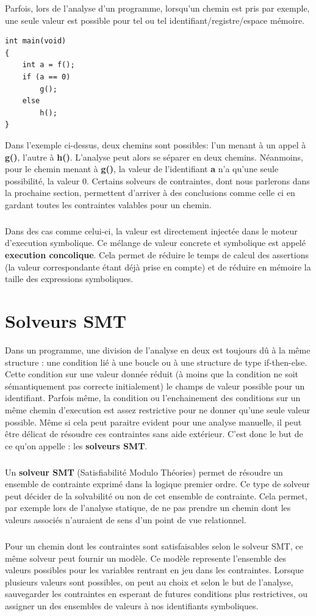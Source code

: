 Parfois, lors de l'analyse d'un programme, lorsqu'un chemin est pris par exemple, une seule valeur est possible pour tel ou tel identifiant/registre/espace mémoire.
\begin {lstlisting}[frame=single]
int main(void)
{
    int a = f();
    if (a == 0)
        g();
    else
        h();
}
\end{lstlisting}
Dans l'exemple ci-dessus, deux chemins sont possibles: l'un menant à un appel à \textbf{g()}, l'autre à \textbf{h()}.
L'analyse peut alors se séparer en deux chemins. Néanmoins, pour le chemin menant à \textbf{g()}, la valeur de l'identifiant \textbf{a}
n'a qu'une seule possibilité, la valeur 0. Certains solveurs de contraintes, dont nous parlerons dans la prochaine section, permettent d'arriver
à des conclusions comme celle ci en gardant toutes les contraintes valables pour un chemin.
\subparagraph{}
Dans des cas comme celui-ci, la valeur est directement injectée dans le moteur d'execution symbolique. Ce mélange de valeur concrete et symbolique est
appelé \textbf{execution concolique}. Cela permet de réduire le temps de calcul des assertions (la valeur correspondante étant déjà prise en compte) et de
réduire en mémoire la taille des expressions symboliques.


\section{Solveurs SMT}
Dans un programme, une division de l'analyse en deux est toujours dû à la même structure : une condition lié à une boucle ou à une structure de type if-then-else.
Cette condition sur une valeur donnée réduit (à moins que la condition ne soit sémantiquement pas correcte initialement) le champs de valeur possible pour un identifiant.
Parfois même, la condition ou l'enchainement des conditions sur un même chemin d'execution est assez restrictive pour ne donner qu'une seule valeur possible.
Même si cela peut paraitre evident pour une analyse manuelle, il peut être délicat de résoudre ces contraintes sans aide extérieur. C'est donc le but de ce qu'on appelle : les \textbf{solveurs SMT}.
\subparagraph{}
Un \textbf{solveur SMT} (Satisfiabilité Modulo Théories) permet de résoudre un ensemble de contrainte exprimé dans la logique premier ordre. Ce type de solveur peut décider
de la solvabilité ou non de cet ensemble de contrainte. Cela permet, par exemple lors de l'analyse statique, de ne pas prendre un chemin dont les valeurs associés n'auraient
de sens d'un point de vue relationnel.
\subparagraph{}
Pour un chemin dont les contraintes sont satisfaisables selon le solveur SMT, ce même solveur peut fournir un modèle. Ce modèle represente l'ensemble des valeurs possibles
pour les variables rentrant en jeu dans les contraintes. Lorsque plusieurs valeurs sont possibles, on peut au choix et selon le but de l'analyse, sauvegarder les contraintes
en esperant de futures conditions plus restrictives, ou assigner un des ensembles de valeurs à nos identifiants symboliques.



